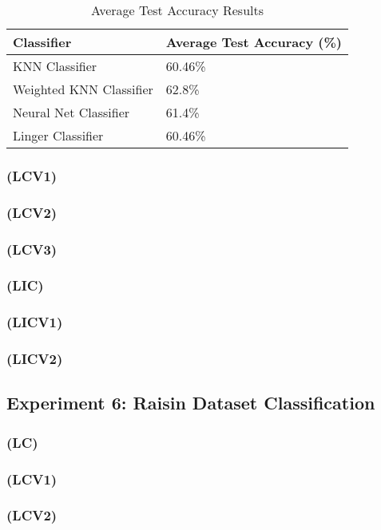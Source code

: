 \documentclass[a4paper, 12pt]{report}
\begin{document}
\begin{table}[H]
    \centering
    \caption{Average Test Accuracy Results}
    \label{tab:average_results_test}
    \begin{tabular}{|l|l|}
    \hline
    \textbf{Classifier} & \textbf{Average Test Accuracy (\%)} \\ \hline
    KNN Classifier & 60.46\% \\ \hline
    Weighted KNN Classifier & 62.8\% \\ \hline
    Neural Net Classifier & 61.4\% \\ \hline
    Linger Classifier & 60.46\% \\ \hline
    \end{tabular}
\end{table}

\subsubsection{(LCV1)}
\subsubsection{(LCV2)}
\subsubsection{(LCV3)}
\subsubsection{(LIC)}
\subsubsection{(LICV1)}
\subsubsection{(LICV2)}

\subsection{Experiment 6: Raisin Dataset Classification}
\subsubsection{(LC)}
\subsubsection{(LCV1)}
\subsubsection{(LCV2)}
\end{document}
